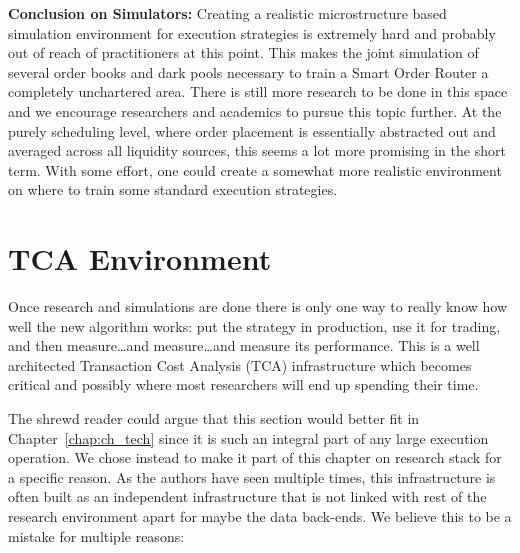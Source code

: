 \noindent\textbf{Conclusion on Simulators:} Creating a realistic microstructure based simulation environment for execution strategies is extremely hard and probably out of reach of practitioners at this point. This makes the joint simulation of several order books and dark pools necessary to train a Smart Order Router a completely unchartered area. There is still more research to be done in this space and we encourage researchers and academics to pursue this topic further. At the purely scheduling level, where order placement is essentially abstracted out and averaged across all liquidity sources, this seems a lot more promising in the short term. With some effort, one could create a somewhat more realistic environment on where to train some standard execution strategies.



\section{TCA Environment}

Once research and simulations are done there is only one way to really know how well the new algorithm works: put the strategy in production, use it for trading, and then measure\dots and measure\dots and measure its performance. This is a well architected Transaction Cost Analysis (TCA) infrastructure which becomes critical and possibly where most researchers will end up spending their time. 


The shrewd reader could argue that this section would better fit in Chapter~\ref{chap:ch_tech} since it is such an integral part of any large execution operation. We chose instead to make it part of this chapter on research stack for a specific reason. As the authors have seen multiple times, this infrastructure is often built as an independent infrastructure that is not linked with rest of the research environment apart for maybe the data back-ends. We believe this to be a mistake for multiple reasons:

